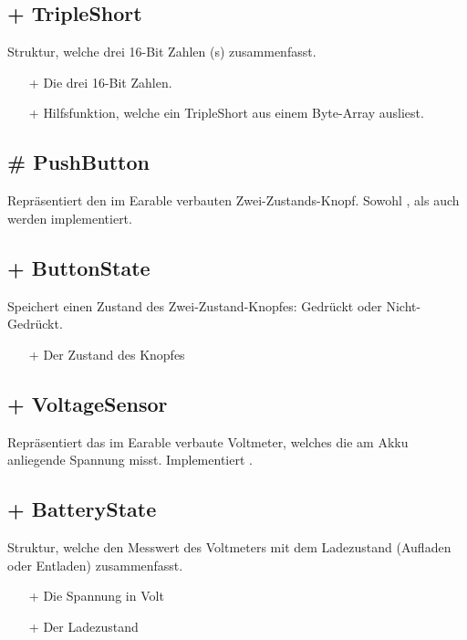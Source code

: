\documentclass[../implementierung.tex]{subfiles}
\begin{document}
		\subsection{+ TripleShort}
			Struktur, welche drei 16-Bit Zahlen (s) zusammenfasst.
			\begin{itemize}
				\item[+]{ Die drei 16-Bit Zahlen.}
				\item[+]{ Hilfsfunktion, welche ein TripleShort
					aus einem Byte-Array ausliest.}
			\end{itemize}

		\subsection{\# PushButton}
			Repräsentiert den im Earable verbauten Zwei-Zustands-Knopf.
			Sowohl , als auch  werden implementiert.

		\subsection{+ ButtonState}
			Speichert einen Zustand des Zwei-Zustand-Knopfes: Gedrückt oder Nicht-Gedrückt.
			\begin{itemize}
				\item[+]{ Der Zustand des Knopfes}
			\end{itemize}

		\subsection{+ VoltageSensor}
			Repräsentiert das im Earable verbaute Voltmeter, welches die am Akku anliegende Spannung misst.
			Implementiert .

		\subsection{+ BatteryState}
			Struktur, welche den Messwert des Voltmeters mit dem Ladezustand (Aufladen oder Entladen) zusammenfasst.
			\begin{itemize}
				\item[+]{ Die Spannung in Volt}
				\item[+]{ Der Ladezustand}
			\end{itemize}
\end{document}
